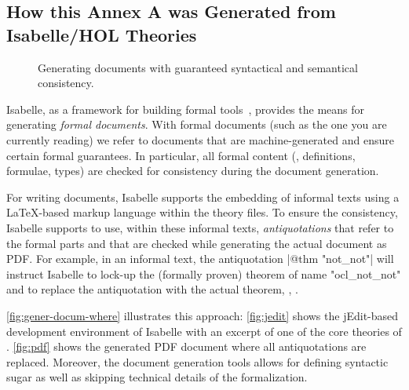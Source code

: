 \subsection{How this Annex A was Generated from Isabelle/HOL Theories}
\begin{figure}[tb]
  \mbox{}\hfill
  \hfill%
  \hfill%
    \hfill\mbox{}
  \caption{Generating documents with guaranteed  syntactical and
    semantical consistency.}
  \label{fig:gener-docum-where}
\end{figure}
Isabelle, as a framework for building formal
tools~\cite{wenzel.ea:building:2007}, provides the means for
generating \emph{formal documents}.  With formal documents (such as
the one you are currently reading) we refer to documents that are
machine-generated and ensure certain formal guarantees. In particular,
all formal content (\eg, definitions, formulae, types) are checked for
consistency during the document generation.

For writing documents, Isabelle supports the embedding of informal
texts using a \LaTeX-based markup language within the theory files. To
ensure the consistency, Isabelle supports to use, within these
informal texts, \emph{antiquotations} that refer to the formal parts
and that are checked while generating the actual document as
PDF\@. For example, in an informal text, the antiquotation
\inlineisar|@{$\text{thm}$ "not_not"}| will instruct Isabelle to
lock-up the (formally proven) theorem of name \inlineisar"ocl_not_not"
and to replace the antiquotation with the actual theorem, \ie,
.

\autoref{fig:gener-docum-where}
illustrates this approach: \autoref{fig:jedit} shows the jEdit-based
development environment of Isabelle with an excerpt of one of the core
theories of \FOCL\@. \autoref{fig:pdf} shows the generated
PDF document where all antiquotations are replaced. Moreover,
the document generation tools allows for defining syntactic sugar as
well as skipping technical details of the formalization.

